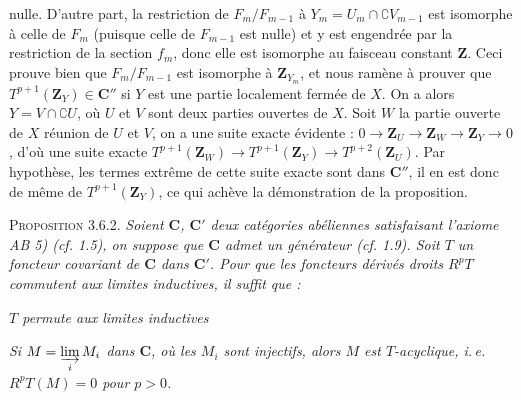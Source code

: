 
\noindent nulle. D'autre part, la restriction de $F_m/F_{m-1}$ à
$Y_m=U_m\cap \complement V_{m-1}$ est isomorphe à celle de $F_m$ (puisque
celle de $F_{m-1}$ est nulle) et y est engendrée par la restriction de la
section $f_m$, donc elle est isomorphe au faisceau constant $\mathbf Z$.
Ceci prouve bien que $F_m/F_{m-1}$ est isomorphe à $\mathbf Z_{Y_m}$, et nous ramène
à prouver que $T^{p+1}(\mathbf Z_Y)\in \mathbf C''$ si $Y$ est une partie localement fermée
de $X$. On a alors $Y=V\cap \complement U$, où $U$ et $V$ sont deux parties
ouvertes de $X$. Soit $W$ la partie ouverte de $X$ réunion de $U$ et $V$, on
a une suite exacte évidente :
$0\to \mathbf Z_U\to \mathbf Z_W\to \mathbf Z_Y\to0$,
d'où une suite exacte
$T^{p+1}(\mathbf Z_W)\to T^{p+1}(\mathbf Z_Y)\to T^{p+2}(\mathbf Z_U)$.
Par hypothèse, les termes extrême de cette suite exacte sont dans $\mathbf C''$, il
en est donc de même de $T^{p+1}(\mathbf Z_Y)$, ce qui achève la démonstration de la
proposition.

\indent\textsc{Proposition 3.6.2.} \textit{Soient $\mathbf C$, $\mathbf C'$ deux
catégories abéliennes satisfaisant l'axiome \textup{AB 5) (}cf. \textup{1.5)}, on suppose que
$\mathbf C$ admet un générateur \textup{(}cf. \textup{1.9)}. Soit $T$ un foncteur covariant de $\mathbf C$ dans
$\mathbf C'$. Pour que les foncteurs dérivés droits $R^pT$ commutent aux limites
inductives, il suffit que :}
\begin{description}
\item[\textnormal{\textit{a})}] \textit{$T$ permute aux limites inductives}
\item[\textnormal{\textit{b})}] \textit{Si $M=\varinjlim\limits_i M_i$ dans $\mathbf C$, où les $M_i$
sont injectifs, alors $M$ est $T$-acyclique, i.\,e.
$R^pT(M)=0$ pour $p>0$.}
\end{description}

